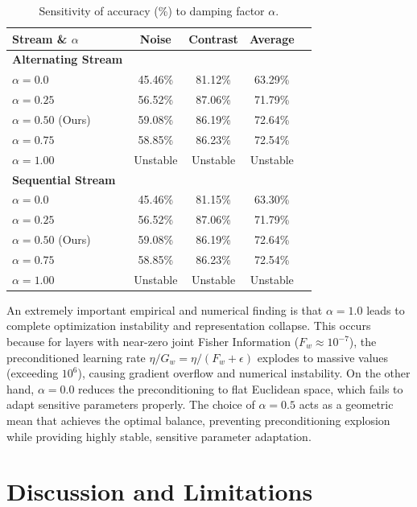\documentclass{article}
\theoremstyle{plain}
\theoremstyle{definition}
\theoremstyle{remark}
\begin{document}
\begin{table}[h]
\caption{Sensitivity of accuracy (\%) to damping factor $\alpha$.}
\label{tab:alpha_sweep}
\vskip 0.1in
\begin{center}
\begin{footnotesize}
\begin{tabular}{lcccc}
\toprule
Stream \& $\alpha$ & Noise & Contrast & Average \\
\midrule
\textbf{Alternating Stream} & & & \\
$\alpha = 0.0$ & 45.46\% & 81.12\% & 63.29\% \\
$\alpha = 0.25$ & 56.52\% & 87.06\% & 71.79\% \\
$\alpha = 0.50$ (Ours) & 59.08\% & 86.19\% & 72.64\% \\
$\alpha = 0.75$ & 58.85\% & 86.23\% & 72.54\% \\
$\alpha = 1.00$ & Unstable & Unstable & Unstable \\
\midrule
\textbf{Sequential Stream} & & & \\
$\alpha = 0.0$ & 45.46\% & 81.15\% & 63.30\% \\
$\alpha = 0.25$ & 56.52\% & 87.06\% & 71.79\% \\
$\alpha = 0.50$ (Ours) & 59.08\% & 86.19\% & 72.64\% \\
$\alpha = 0.75$ & 58.85\% & 86.23\% & 72.54\% \\
$\alpha = 1.00$ & Unstable & Unstable & Unstable \\
\bottomrule
\end{tabular}
\end{footnotesize}
\end{center}
\vskip -0.1in
\end{table}

An extremely important empirical and numerical finding is that $\alpha=1.0$ leads to complete optimization instability and representation collapse. This occurs because for layers with near-zero joint Fisher Information ($F_w \approx 10^{-7}$), the preconditioned learning rate $\eta/G_w = \eta/(F_w+\epsilon)$ explodes to massive values (exceeding $10^6$), causing gradient overflow and numerical instability. On the other hand, $\alpha=0.0$ reduces the preconditioning to flat Euclidean space, which fails to adapt sensitive parameters properly. The choice of $\alpha=0.5$ acts as a geometric mean that achieves the optimal balance, preventing preconditioning explosion while providing highly stable, sensitive parameter adaptation.

\section{Discussion and Limitations}
\end{document}
